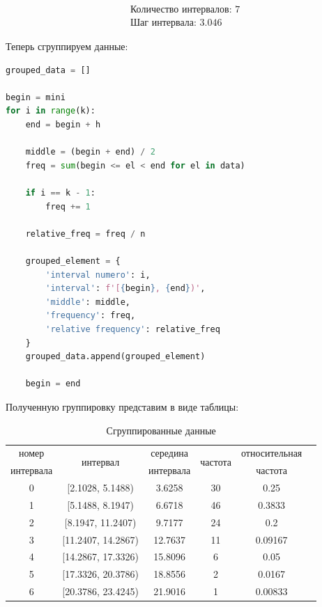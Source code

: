 \documentclass[a4paper, 14pt]{extarticle}
\begin{document}
\vspace{-5pt}

\begin{align*}
    & \text{Количество интервалов: } 7 \\
    & \text{Шаг интервала: }  3.046
\end{align*}

Теперь сгруппируем данные:

\vspace{10pt}

\begin{lstlisting}[language=Python]
grouped_data = []

begin = mini
for i in range(k):
    end = begin + h

    middle = (begin + end) / 2
    freq = sum(begin <= el < end for el in data)
    
    if i == k - 1:
        freq += 1

    relative_freq = freq / n

    grouped_element = {
        'interval numero': i,
        'interval': f'[{begin}, {end})',
        'middle': middle,
        'frequency': freq,
        'relative frequency': relative_freq
    }
    grouped_data.append(grouped_element)

    begin = end
\end{lstlisting}
\vspace{10pt}
Полученную группировку представим в виде таблицы:
\vspace{10pt}
\begin{table}[h!]
  \centering
  \renewcommand{\arraystretch}{1.5}
  \begin{adjustbox}{max width=0.8\textwidth}
      \begin{tabular}{|c|c|c|c|c|c|}
      \hline
      номер     & \multirow{2}{*}{интервал} & середина  & \multirow{2}{*}{частота} & относительная \\
      интервала &                           & интервала &                          & частота       \\
      \hline
      0 & [2.1028, 5.1488)   & 3.6258  & 30 & 0.25    \\
      \hline
      1 & [5.1488, 8.1947)   & 6.6718  & 46 & 0.3833  \\
      \hline
      2 & [8.1947, 11.2407)  & 9.7177  & 24 & 0.2     \\
      \hline
      3 & [11.2407, 14.2867) & 12.7637 & 11 & 0.09167 \\
      \hline
      4 & [14.2867, 17.3326) & 15.8096 & 6  & 0.05    \\
      \hline
      5 & [17.3326, 20.3786) & 18.8556 & 2  & 0.0167  \\
      \hline
      6 & [20.3786, 23.4245) & 21.9016 & 1  & 0.00833 \\
      \hline
      \end{tabular}
  \end{adjustbox}
  \caption{Сгруппированные данные}
  \label{tab:your_table_label}
\end{table}
\end{document}
